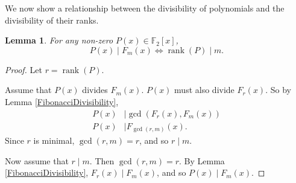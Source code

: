 \documentclass[a4paper]{article}
\newtheorem{lemma}[theorem]{Lemma}
\newcommand{\F}{\mathbb{F}}
\begin{document}
	We now show a relationship between the divisibility of polynomials and the divisibility of their ranks.
	\begin{lemma}\label{rankApparition}
		For any non-zero $P(x) \in \F_2[x]$,
		\begin{equation*}
			P(x) \mid F_m(x) \iff \operatorname{rank}(P) \mid m.
		\end{equation*}
	\end{lemma}
	\begin{proof}
		Let $r = \operatorname{rank}(P)$.
		
		Assume that $P(x)$ divides $F_m(x)$.
		$P(x)$ must also divide $F_r(x)$.
		So by Lemma \ref{FibonacciDivisibility},
		\begin{align*}
			P(x) &\mid \gcd{(F_r(x), F_m(x))} \\
			P(x) &\mid F_{\gcd(r, m)}(x).
		\end{align*}
		Since $r$ is minimal, $\gcd{(r,m)} = r$, and so $r \mid m$.
		
		Now assume that $r \mid m$.
		Then $\gcd{(r,m)} = r$.
		By Lemma \ref{FibonacciDivisibility}, $F_r(x) \mid F_m(x)$, and so $P(x) \mid F_m(x)$.
	\end{proof}
	
\end{document}
